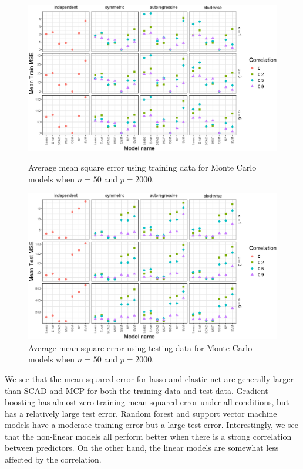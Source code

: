 \documentclass{article}
\begin{document}
\begin{figure}[p!]
	\centering
	\includegraphics[width = \textwidth]{images/facet-train-mse/facet_train_mse_50_2000.eps}
	\caption{Average mean square error using training data for Monte Carlo models when $n = 50$ and $p = 2000$.}
	\label{fig:train-mse-50-2000}
	
	\bigskip
	
	\includegraphics[width = \textwidth]{images/facet-test-mse/facet_test_mse_50_2000.eps}
	\caption{Average mean square error using testing data for Monte Carlo models when $n = 50$ and $p = 2000$.}
	\label{fig:test-mse-50-2000}
\end{figure}

We see that the mean squared error for lasso and elastic-net are generally larger than SCAD and MCP for both the training data and test data. Gradient boosting has almost zero training mean squared error under all conditions, but has a relatively large test error. Random forest and support vector machine models have a moderate training error but a large test error. Interestingly, we see that the non-linear models all perform better when there is a strong correlation between predictors. On the other hand, the linear models are somewhat less affected by the correlation.
\end{document}
